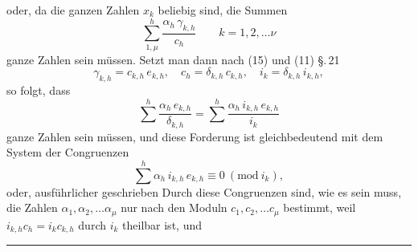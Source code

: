 oder, da die ganzen Zahlen $x_k$ beliebig sind, die Summen
\[
\sum_{1,\mu}^{h}\frac{\alpha_h\,\gamma_{k,h}}{c_h}\qquad k=1,2,\ldots \nu
\]
ganze Zahlen sein müssen. Setzt man dann nach (15) und (11) \S.\,21
\[
\gamma_{k,h}=c_{k,h}\,e_{k,h},\quad c_h=\delta_{k,h}\,c_{k,h},\quad i_k=\delta_{k,h}\,i_{k,h},
\]
so folgt, dass
\[
\sum^{h}\frac{\alpha_h\,e_{k,h}}{\delta_{k,h}}=\sum^{h}\frac{\alpha_h\,i_{k,h}\,e_{k,h}}{i_k}
\]
ganze Zahlen sein müssen, und diese Forderung ist gleichbedeutend mit dem System der Congruenzen
\[
\sum^h \alpha_h\,i_{k,h}\,e_{k,h}\equiv 0\ (\mathrm{mod}\ i_k),
\]
oder, ausführlicher geschrieben
Durch diese Congruenzen sind, wie es sein muss, die Zahlen $\alpha_1, \alpha_2, \ldots \alpha_\mu$ nur nach den Moduln $c_1, c_2, \ldots c_\mu$ bestimmt, weil $i_{k,h}c_h=i_k c_{k,h}$ durch $i_k$ theilbar ist, und 

\begin{center}
\rule{4cm}{0.4pt}
\end{center}
